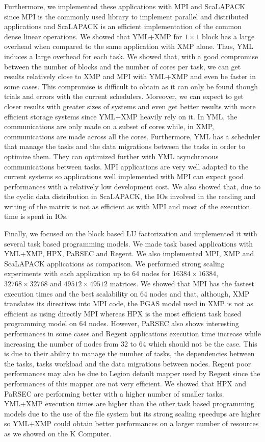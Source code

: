 Furthermore, we implemented these applications with MPI and ScaLAPACK since MPI is the commonly used library to implement parallel and distributed applications and ScaLAPACK is an efficient implementation of the common dense linear operations.
We showed that YML+XMP for $1 \times 1$ block has a large overhead when compared to the same application with XMP alone.
Thus, YML induces a large overhead for each task.
We showed that, with a good compromise between the number of blocks and the number of cores per task, we can get results relatively close to XMP and MPI with YML+XMP and even be faster in some cases.
This compromise is difficult to obtain as it can only be found though trials and errors with the current schedulers.
Moreover, we can expect to get closer results with greater sizes of systems and even get better results with more efficient storage systems since YML+XMP heavily rely on it.
In YML, the communications are only made on a subset of cores while, in XMP, communications are made across all the cores.
Furthermore, YML has a scheduler that manage the tasks and the data migrations between the tasks in order to optimize them.
They can optimized further with YML asynchronous communications between tasks.
MPI applications are very well adapted to the current systems so applications well implemented with MPI can expect good performances with a relatively low development cost.
We also showed that, due to the cyclic data distribution in ScaLAPACK, the IOs involved in the reading and writing of the matrix is not as efficient as with MPI and most of the execution time is spent in IOs.

Finally, we focused on the block based LU factorization and implemented it with several task based programming models.
We made task based applications with YML+XMP, HPX, PaRSEC and Regent.
We also implemented MPI, XMP and ScaLAPACK applications as comparison.
We performed strong scaling experiments with each application up to 64 nodes for $16384 \times 16384$, $32768 \times 32768$ and $49512 \times 49512$ matrices.
We showed that MPI has the fastest execution times and the best scalability on 64 nodes and that, although, XMP translates its directives into MPI code, the PGAS model used in XMP is not as efficient as using directly MPI whereas HPX is the most efficient task based programming model on 64 nodes.
However, PaRSEC also shows interesting performances in some cases and Regent applications execution time increase while increasing the number of nodes from 32 to 64 which should not be the case.
This is due to their ability to manage the number of tasks, the dependencies between the tasks, tasks workload and the data migrations between nodes.
Regent poor performances may also be due to Legion default mapper used by Regent since the performances of this mapper are not very efficient.
We showed that HPX and PaRSEC are performing better with a higher number of smaller tasks.
YML+XMP execution times are higher than the other task based programming models due to the use of the file system but its strong scaling speedups are higher so YML+XMP could obtain better performances on a larger number of resources as we showed on the K Computer.


